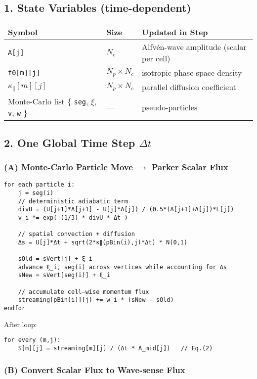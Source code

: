 \subsection*{1. State Variables (time-dependent)}

\begin{tabular}{|l|l|l|}
\hline
\textbf{Symbol} & \textbf{Size} & \textbf{Updated in Step} \\
\hline
\texttt{A[j]} & $N_c$ & Alfvén-wave amplitude (scalar per cell) \\
\texttt{f0[m][j]} & $N_p \times N_c$ & isotropic phase-space density \\
\texttt{$\kappa_\parallel[m][j]$} & $N_p \times N_c$ & parallel diffusion coefficient \\
Monte-Carlo list \{ \texttt{seg}, \texttt{$\xi$}, \texttt{v}, \texttt{w} \} & --- & pseudo-particles \\
\hline
\end{tabular}

\subsection*{2. One Global Time Step $\Delta t$}

\subsubsection*{(A) Monte-Carlo Particle Move $\rightarrow$ Parker Scalar Flux}

\begin{verbatim}
for each particle i:
    j = seg(i)
    // deterministic adiabatic term
    divU = (U[j+1]*A[j+1] - U[j]*A[j]) / (0.5*(A[j+1]+A[j])*L[j])
    v_i *= exp( (1/3) * divU * Δt )

    // spatial convection + diffusion
    Δs = U[j]*Δt + sqrt(2*κ∥(pBin(i),j)*Δt) * N(0,1)

    sOld = sVert[j] + ξ_i
    advance ξ_i, seg(i) across vertices while accounting for Δs
    sNew = sVert[seg(i)] + ξ_i

    // accumulate cell–wise momentum flux
    streaming[pBin(i)][j] += w_i * (sNew - sOld)
endfor
\end{verbatim}

After loop:
\begin{verbatim}
for every (m,j):
    S[m][j] = streaming[m][j] / (Δt * A_mid[j])   // Eq.(2)
\end{verbatim}

\subsubsection*{(B) Convert Scalar Flux to Wave-sense Flux}

